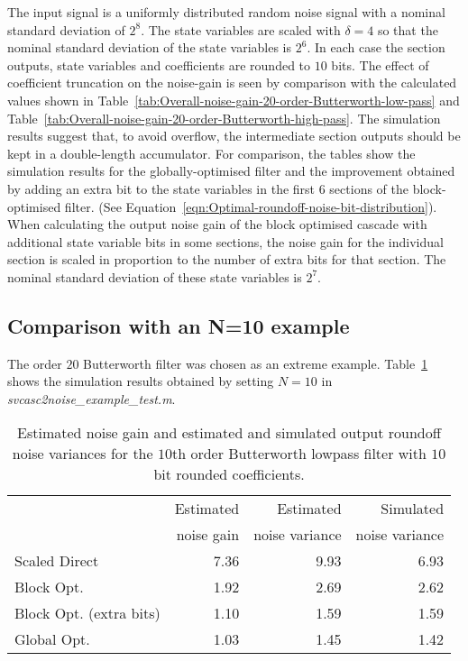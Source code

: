 \documentclass[a4paper,twoside,10pt,english]{report}
\begin{document}
The input signal is a uniformly distributed random noise signal with a nominal
standard deviation of $2^{8}$. The state variables are scaled with $\delta=4$ so
that the nominal standard deviation of the state variables is $2^{6}$. In each 
case the section outputs, state variables and coefficients are rounded to $10$ 
bits. The effect of coefficient truncation on the noise-gain is seen by
 comparison with the calculated values shown in
Table~\ref{tab:Overall-noise-gain-20-order-Butterworth-low-pass} and
Table~\ref{tab:Overall-noise-gain-20-order-Butterworth-high-pass}. The
simulation results suggest that, to avoid overflow, the intermediate section
outputs should be kept in a double-length accumulator. For comparison, the
tables show the simulation results for the globally-optimised filter and the
improvement obtained by adding an extra bit to the state variables in the
first $6$ sections of the block-optimised filter. (See
Equation~\ref{eqn:Optimal-roundoff-noise-bit-distribution}). When
calculating the output noise gain of the block optimised cascade with additional
state variable bits in some sections, the noise gain for the individual section
is scaled in proportion to the number of extra bits for that section. The nominal
standard deviation of these state variables is $2^7$.
\subsection{Comparison with an N=10 example}
The order $20$ Butterworth filter was chosen as an extreme example. 
Table~\ref{tab:Simulated-noise-10-order-Butterworth-low-pass} shows the 
simulation results obtained by setting $N=10$ in 
\emph{svcasc2noise\_example\_test.m}.
\begin{table}[hptb]
\centering
\begin{threeparttable}
\begin{tabular}{lrrr}  \toprule
& Estimated & Estimated & Simulated \\ 
& noise gain & noise variance & noise variance\\ 
\midrule
 Scaled Direct &  7.36 &  9.93 &  6.93 \\ 
 Block Opt.&  1.92 &  2.69 &  2.62 \\ 
 Block Opt. (extra bits) &  1.10 &  1.59 &  1.59 \\ 
 Global Opt. &  1.03 &  1.45 &  1.42 \\ 
\bottomrule
\end{tabular}
\end{threeparttable}
\caption[Butterworth 10th order lowpass noise simulation]{Estimated noise gain and estimated and simulated output roundoff noise variances for the $10$th order Butterworth lowpass filter with $10$ bit rounded coefficients.}
\label{tab:Simulated-noise-10-order-Butterworth-low-pass}
\end{table}
\end{document}
